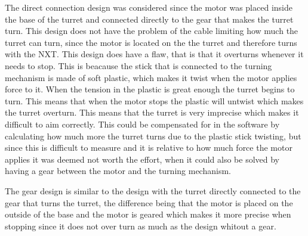 The direct connection design was considered since the motor was placed inside
the base of the turret and connected directly to the gear that makes the turret turn. This
design does not have the problem of the cable limiting how much the turret can
turn, since the motor is located on the the turret and therefore turns with the
NXT. This design does have a flaw, that is that it overturns whenever it needs
to stop. This is beacause the stick that is connected to the turning mechanism
is made of soft plastic, which makes it twist when the motor applies force to
it. When the tension in the plastic is great enough the turret begins to turn.
This means that when the motor stops the plastic will untwist which makes the
turret overturn. This means that the turret is very imprecise which makes it
difficult to aim correctly. This could be compensated for in the software by
calculating how much more the turret turns due to the plastic stick twisting,
but since this is difficult to measure and it is relative to how much force the motor applies it was deemed
not worth the effort, when it could also be solved by having a gear between
the motor and the turning mechanism.\nl

The gear design is similar to the design with the turret directly connected to
the gear that turns the turret, the difference being that the motor is placed on
the outside of the base and the motor is geared which makes it more precise when
stopping since it does not over turn as much as the design whitout a gear. 


